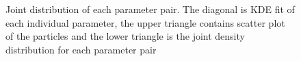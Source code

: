 \begin{figure}[h]
    \begin{center}
    \end{center}
    \caption[Joint density distribution of each parameter pair]%
    {Joint distribution of each parameter pair. The diagonal is KDE fit of each individual parameter, the upper triangle contains scatter plot of the particles and the lower triangle is the joint density distribution for each parameter pair}
    \label{fig:model5_para_joint}
\end{figure}

